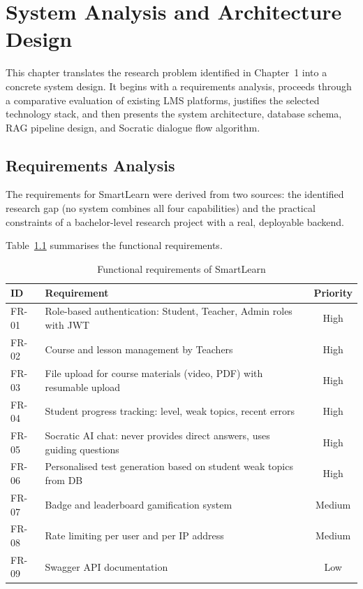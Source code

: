 \documentclass[12pt,a4paper]{report}
\begin{document}
\chapter{System Analysis and Architecture Design}

This chapter translates the research problem identified in Chapter~1 into a concrete
system design. It begins with a requirements analysis, proceeds through a comparative
evaluation of existing LMS platforms, justifies the selected technology stack, and then
presents the system architecture, database schema, RAG pipeline design, and Socratic
dialogue flow algorithm.

\section{Requirements Analysis}

The requirements for SmartLearn were derived from two sources: the identified research
gap (no system combines all four capabilities) and the practical constraints of a
bachelor-level research project with a real, deployable backend.

Table~\ref{tab:fr} summarises the functional requirements.

\begin{table}[htbp]
\centering
\caption{Functional requirements of SmartLearn}
\label{tab:fr}
\renewcommand{\arraystretch}{1.25}
\begin{tabularx}{\textwidth}{l X c}
\toprule
\textbf{ID} & \textbf{Requirement} & \textbf{Priority}\\
\midrule
FR-01 & Role-based authentication: Student, Teacher, Admin roles with JWT & High\\
FR-02 & Course and lesson management by Teachers & High\\
FR-03 & File upload for course materials (video, PDF) with resumable upload & High\\
FR-04 & Student progress tracking: level, weak topics, recent errors & High\\
FR-05 & Socratic AI chat: never provides direct answers, uses guiding questions & High\\
FR-06 & Personalised test generation based on student weak topics from DB & High\\
FR-07 & Badge and leaderboard gamification system & Medium\\
FR-08 & Rate limiting per user and per IP address & Medium\\
FR-09 & Swagger API documentation & Low\\
\bottomrule
\end{tabularx}
\end{table}
\end{document}
